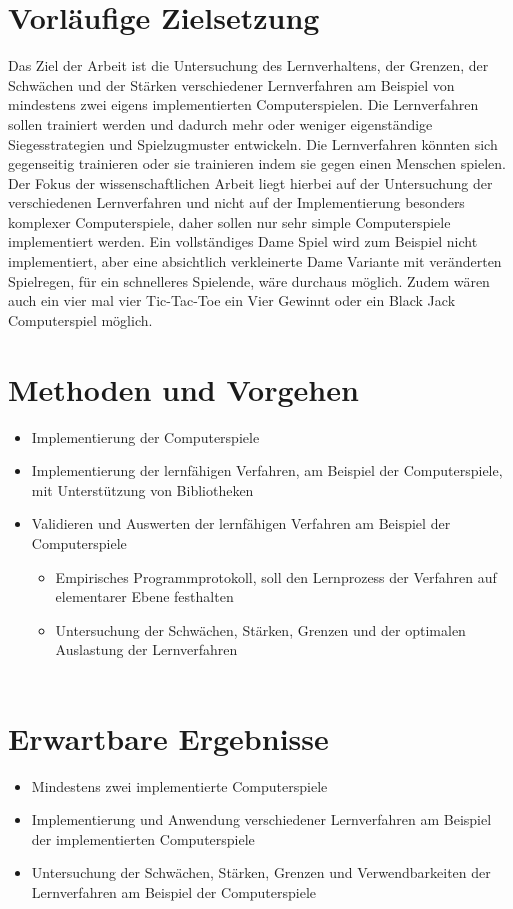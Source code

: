 \documentclass[12pt,a4paper]{scrartcl}
\begin{document}
\section*{Vorläufige Zielsetzung}
Das Ziel der Arbeit ist die Untersuchung des Lernverhaltens, der Grenzen, der Schwächen und der Stärken verschiedener Lernverfahren am Beispiel von mindestens zwei eigens implementierten Computerspielen. Die Lernverfahren sollen trainiert werden und dadurch mehr oder weniger eigenständige Siegesstrategien und Spielzugmuster entwickeln. Die Lernverfahren könnten sich gegenseitig trainieren oder sie trainieren indem sie gegen einen Menschen spielen. Der Fokus der wissenschaftlichen Arbeit liegt hierbei auf der Untersuchung der verschiedenen Lernverfahren und nicht auf der Implementierung besonders komplexer Computerspiele, daher sollen nur sehr simple Computerspiele implementiert werden. Ein vollständiges Dame Spiel wird zum Beispiel nicht implementiert, aber eine absichtlich verkleinerte Dame Variante mit veränderten Spielregen, für ein schnelleres Spielende, wäre durchaus möglich. Zudem wären auch ein vier mal vier Tic-Tac-Toe ein Vier Gewinnt oder ein Black Jack Computerspiel möglich.

\section*{Methoden und Vorgehen}

\begin{itemize}
	\item Implementierung der Computerspiele
	\item Implementierung der lernfähigen Verfahren, am Beispiel der Computerspiele, mit Unterstützung von Bibliotheken
	\item Validieren und Auswerten der lernfähigen Verfahren am Beispiel der Computerspiele
	\begin{itemize}
		\item Empirisches Programmprotokoll, soll den Lernprozess der Verfahren auf elementarer Ebene festhalten
		\item Untersuchung der Schwächen, Stärken, Grenzen und der optimalen Auslastung der Lernverfahren\\\\
	\end{itemize}
\end{itemize}	

\section*{Erwartbare Ergebnisse}
\begin{itemize}
	\item Mindestens zwei implementierte Computerspiele
	\item Implementierung und Anwendung verschiedener Lernverfahren am Beispiel der implementierten Computerspiele
	\item Untersuchung der Schwächen, Stärken, Grenzen und Verwendbarkeiten der Lernverfahren am Beispiel der Computerspiele
\end{itemize}
\end{document}
